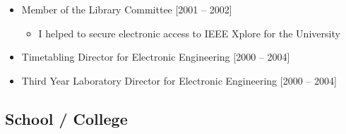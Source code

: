 \documentclass[10pt,a4paper]{res} %
\begin{document}
\begin{resume}
\begin{itemize}
\begin{itemize}
\end{itemize}
\item Member of the Library Committee [2001 -- 2002]
\begin{itemize} \itemsep -2pt
\item I helped to secure electronic access to IEEE Xplore for the University
\end{itemize}
\item Timetabling Director for Electronic Engineering [2000 -- 2004]
\item Third Year Laboratory Director for Electronic Engineering [2000 -- 2004]
\end{itemize}

\subsection*{School / College}


\end{resume}
\end{document}
